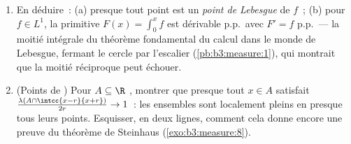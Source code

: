 \begin{problem}
\begin{enumerate}[resume]
        \emph{(Clair pour $f$ . En général écrire
        $f = g + h$, $g$  à support compact,
        $\norm h_1 < \varepsilon$
        (\cref{thm:b3:lp:density})~; l'ensemble où
        $\limsup_{r\to0}$ de l'oscillation moyennée dépasse
        $\delta$ est  dans $\{Mh > \delta/2\} \cup
        \{\abs h > \delta/2\}$, de 
        $O(\varepsilon/\delta)$~; faire $\varepsilon \to
        0$, puis $\delta \to 0$ le long d'une suite.)}
  \item En déduire~: (a) presque tout point est un
        \emph{point de Lebesgue} de $f$~; (b) pour $f \in
        L^1$, la primitive $F(x) = \int_0^xf$ est dérivable
        p.p.\ avec $F' = f$ p.p.\ --- la moitié intégrale
        du théorème fondamental du calcul dans le monde de
        Lebesgue, fermant le cercle  par l'escalier
        (\cref{pb:b3:measure:1}), qui montrait que la
        moitié réciproque peut échouer.
  \item (Points de ) Pour $A \subseteq \R$
        , montrer que presque tout $x \in A$
        satisfait
        $\frac{\lambda(A\cap\intcc{x-r}{x+r})}{2r} \to 1$~:
        les ensembles  sont localement pleins en
        presque tous leurs points. Esquisser, en deux
        lignes, comment cela donne encore une preuve du
        théorème de Steinhaus
        (\cref{exo:b3:measure:8}).
\end{enumerate}


\end{problem}
